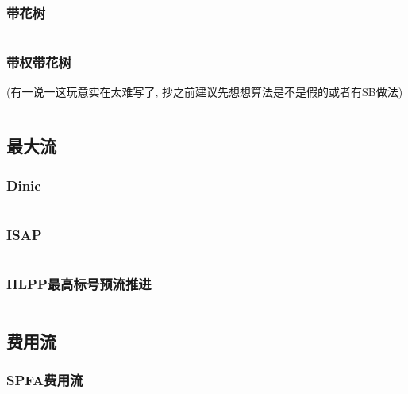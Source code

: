 \documentclass[a4paper]{article}
\begin{document}
\begin{multicols}{2}
				\subsubsection{带花树}
					\inputminted{cpp}{../src/graph/带花树.cpp}

				\subsubsection{带权带花树}
					(有一说一这玩意实在太难写了, 抄之前建议先想想算法是不是假的或者有SB做法)
					\inputminted{cpp}{../src/graph/带权带花树.cpp}
			
			



			\subsection{最大流}
				\subsubsection{Dinic}
					\inputminted{cpp}{../src/graph/Dinic.cpp}

				\subsubsection{ISAP}
					\inputminted{cpp}{../src/graph/ISAP.cpp}

				\subsubsection{HLPP最高标号预流推进}
					\inputminted{cpp}{../src/graph/HLPP.cpp}
			
			\subsection{费用流}
				\subsubsection{SPFA费用流}
					\inputminted{cpp}{../src/graph/SPFA费用流.cpp}




\end{multicols}
\end{document}
